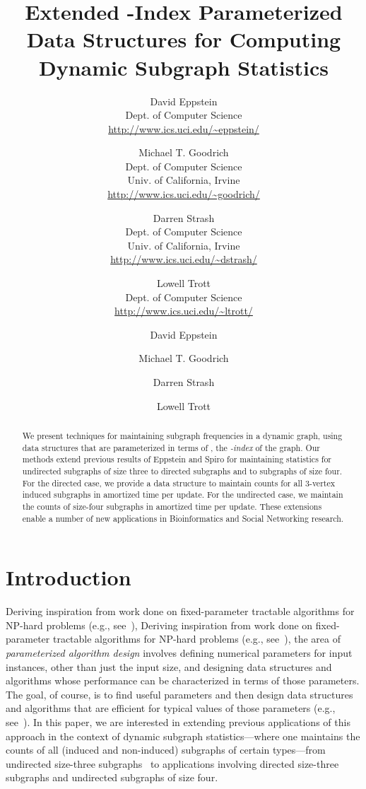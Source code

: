 \documentclass[11pt]{article}
\title{Extended -Index Parameterized Data Structures for Computing Dynamic Subgraph Statistics}
\author{
David Eppstein \\
Dept. of Computer Science \\
\url{http://www.ics.uci.edu/~eppstein/}
\and
Michael T. Goodrich \\
Dept. of Computer Science \\
Univ. of California, Irvine \\
\url{http://www.ics.uci.edu/~goodrich/}
\and 
Darren Strash \\
Dept. of Computer Science \\
Univ. of California, Irvine \\
\url{http://www.ics.uci.edu/~dstrash/}
\and
Lowell Trott \\
Dept. of Computer Science \\
\url{http://www.ics.uci.edu/~ltrott/}
}
\date{}
\author{David Eppstein \and Michael T. Goodrich \and Darren Strash \and Lowell Trott}
\institute{Computer Science Department, University of California, Irvine, USA.}
\begin{document}
\maketitle

\pagestyle{plain}


\begin{abstract} We present techniques for maintaining 
subgraph frequencies in a dynamic graph,
using data structures that are parameterized in terms of , the 
\emph{-index} of the graph.
Our methods extend previous results of Eppstein and Spiro for
maintaining statistics for undirected subgraphs of size three to
directed subgraphs and to subgraphs of size four.
For the directed case, we provide a data 
structure to maintain counts for all 3-vertex induced subgraphs 
in  amortized time per update.
For the undirected case, we maintain the counts of size-four subgraphs
in  amortized time per update.
These extensions enable a number of new applications in
Bioinformatics and Social Networking research.
\end{abstract}

\section{Introduction}
\ifFull
Deriving inspiration from work done on
fixed-parameter tractable algorithms for NP-hard problems (e.g.,
see~\cite{cllor-fpadf-08,dffht-fparp-05,df-fptcb-95,gghnw-cbfp-06,nr-oefpa-03}),
\else
Deriving inspiration from work done on
fixed-parameter tractable algorithms for NP-hard problems (e.g.,
see~\cite{dffht-fparp-05,df-fptcb-95,nr-oefpa-03}),
\fi
the area of
\emph{parameterized algorithm design} involves defining numerical
parameters for input instances, other than just the input size,
and designing data structures and algorithms whose performance
can be characterized in terms of those parameters.
The goal, of course, is to find useful parameters and
then design data structures and algorithms that are efficient for
typical values of those parameters 
(e.g., see~\cite{eg-snprn-08,es-hgadss-09}).
In this paper, we are interested in extending previous applications
of this approach in the context of dynamic subgraph statistics---where 
one maintains the counts of all (induced and non-induced) subgraphs 
of certain types---from undirected size-three
subgraphs~\cite{es-hgadss-09} to applications involving directed size-three
subgraphs and undirected subgraphs of size four.
\end{document}
